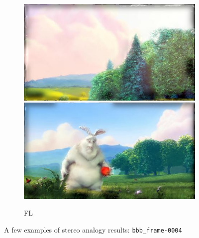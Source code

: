 \begin{figure}
	\begin{subfigure}[t]{0.135\textwidth}
		\includegraphics[width=\textwidth]{figures/stereo/bbb_frame-0004-12}\\
		\includegraphics[width=\textwidth]{figures/stereo/bbb_frame-0092-12}
		\caption{FL}
	\end{subfigure}
	\caption{A few examples of stereo analogy results: \texttt{bbb\_frame-0004}}
	\label{fig:stereo_results}
\end{figure}

